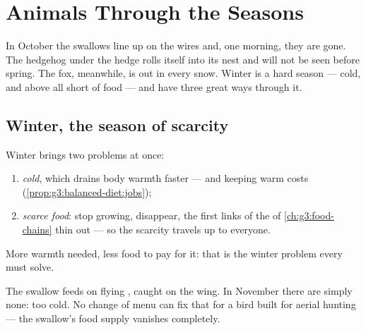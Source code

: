 \chapter{Animals Through the Seasons}\label{ch:g3:animals-through-seasons}

In October the swallows line up on the wires and, one morning,
they are gone. The hedgehog under the hedge rolls itself into
its  nest and will not be seen before spring. The fox,
meanwhile, is out in every snow. Winter is a hard season ---
cold, and above all short of food --- and  have three
great ways through it.

\section{Winter, the season of scarcity}

\begin{proposition}\label{prop:g3:animals-through-seasons:problem}
Winter brings  two problems at once:
\begin{enumerate}
  \item \emph{cold}, which drains body warmth faster --- and
        keeping warm costs 
        (\cref{prop:g3:balanced-diet:jobs});
  \item \emph{scarce food}:  stop growing, 
        disappear, the first links of the  of
        \cref{ch:g3:food-chains} thin out --- so the scarcity
        travels up to everyone.
\end{enumerate}
More warmth needed, less food to pay for it: that is the winter
problem every  must solve.
\end{proposition}
\admitted

\begin{example}\label{ex:g3:animals-through-seasons:insects}
The swallow feeds on flying , caught on the wing. In
November there are simply none: too cold. No change of menu can
fix that for a bird built for aerial hunting --- the swallow's
food supply vanishes completely.
\end{example}

